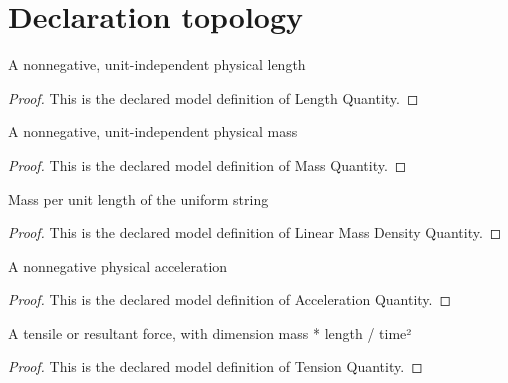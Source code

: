 \section{Declaration topology}
\begin{definition}
  \label{def:physics:phyx-mini-0306:phyxminiproblems-problemphyxmini0306-lengthquantity}
  A nonnegative, unit-independent physical length
\end{definition}
\begin{proof}
  This is the declared model definition of Length Quantity.
\end{proof}
\begin{definition}
  \label{def:physics:phyx-mini-0306:phyxminiproblems-problemphyxmini0306-massquantity}
  A nonnegative, unit-independent physical mass
\end{definition}
\begin{proof}
  This is the declared model definition of Mass Quantity.
\end{proof}
\begin{definition}
  \label{def:physics:phyx-mini-0306:phyxminiproblems-problemphyxmini0306-linearmassdensityquantity}
  Mass per unit length of the uniform string
\end{definition}
\begin{proof}
  This is the declared model definition of Linear Mass Density Quantity.
\end{proof}
\begin{definition}
  \label{def:physics:phyx-mini-0306:phyxminiproblems-problemphyxmini0306-accelerationquantity}
  A nonnegative physical acceleration
\end{definition}
\begin{proof}
  This is the declared model definition of Acceleration Quantity.
\end{proof}
\begin{definition}
  \label{def:physics:phyx-mini-0306:phyxminiproblems-problemphyxmini0306-tensionquantity}
  A tensile or resultant force, with dimension mass * length / time²
\end{definition}
\begin{proof}
  This is the declared model definition of Tension Quantity.
\end{proof}
